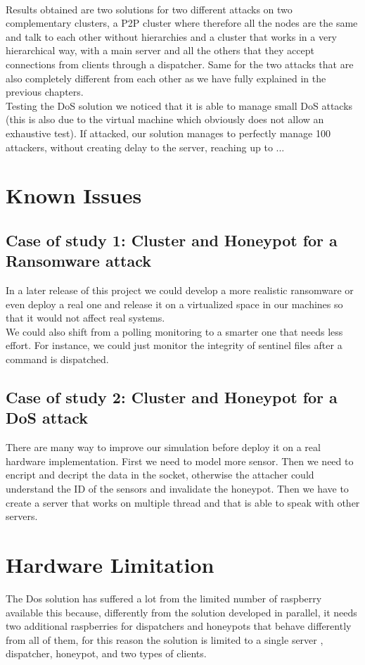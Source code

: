 \\
Results obtained are two solutions for two different attacks on two complementary clusters, a P2P cluster where therefore all the nodes are the same and talk to each other without hierarchies and a cluster that works in a very hierarchical way, with a main server and all the others that they accept connections from clients through a dispatcher.
Same for the two attacks that are also completely different from each other as we have fully explained in the previous chapters.
\\
Testing the DoS solution we noticed that it is able to manage small DoS attacks (this is also due to the virtual machine which obviously does not allow an exhaustive test). If attacked, our solution manages to perfectly manage 100 attackers, without creating delay to the server, reaching up to ...

\section{Known Issues}

\subsection{Case of study 1: Cluster and Honeypot for a Ransomware attack}
In a later release of this project we could develop a more realistic ransomware or even deploy a real one and release it on a virtualized space in our machines so that it would not affect real systems.\\
We could also shift from a polling monitoring to a smarter one that needs less effort. For instance, we could just monitor the integrity of sentinel files after a command is dispatched.
\subsection{Case of study 2: Cluster and Honeypot for a DoS attack}
There are many way to improve our simulation before deploy it on a real hardware implementation. First we need to model more sensor. Then we need to encript and decript the data in the socket, otherwise the attacher could understand the ID of the sensors and invalidate the honeypot. Then we have to create a server that works on multiple thread and that is able to speak with other servers.

\section{Hardware Limitation}
The Dos solution has suffered a lot from the limited number of raspberry available this because, differently from the solution developed in parallel, it needs two additional raspberries for dispatchers and honeypots that behave differently from all of them, for this reason the solution is limited to a single server , dispatcher, honeypot, and two types of clients.

